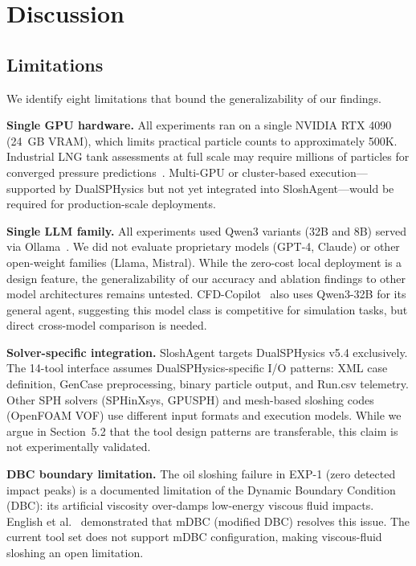 \documentclass[11pt]{article}
\begin{document}
\section{Discussion}

\subsection{Limitations}

We identify eight limitations that bound the generalizability of our findings.

\textbf{Single GPU hardware.} All experiments ran on a single NVIDIA RTX 4090 (24~GB VRAM), which limits practical particle counts to approximately 500K. Industrial LNG tank assessments at full scale may require millions of particles for converged pressure predictions~\citep{dominguez2022dualsphysics}. Multi-GPU or cluster-based execution---supported by DualSPHysics but not yet integrated into SloshAgent---would be required for production-scale deployments.

\textbf{Single LLM family.} All experiments used Qwen3 variants (32B and 8B) served via Ollama~\citep{qwen2025, ollama2024}. We did not evaluate proprietary models (GPT-4, Claude) or other open-weight families (Llama, Mistral). While the zero-cost local deployment is a design feature, the generalizability of our accuracy and ablation findings to other model architectures remains untested. CFD-Copilot~\citep{cfdcopilot2025} also uses Qwen3-32B for its general agent, suggesting this model class is competitive for simulation tasks, but direct cross-model comparison is needed.

\textbf{Solver-specific integration.} SloshAgent targets DualSPHysics v5.4 exclusively. The 14-tool interface assumes DualSPHysics-specific I/O patterns: XML case definition, GenCase preprocessing, binary particle output, and Run.csv telemetry. Other SPH solvers (SPHinXsys, GPUSPH) and mesh-based sloshing codes (OpenFOAM VOF) use different input formats and execution models. While we argue in Section~5.2 that the tool design patterns are transferable, this claim is not experimentally validated.

\textbf{DBC boundary limitation.} The oil sloshing failure in EXP-1 (zero detected impact peaks) is a documented limitation of the Dynamic Boundary Condition (DBC): its artificial viscosity over-damps low-energy viscous fluid impacts. English et al.~\citep{english2021mdbc} demonstrated that mDBC (modified DBC) resolves this issue. The current tool set does not support mDBC configuration, making viscous-fluid sloshing an open limitation.
\end{document}
